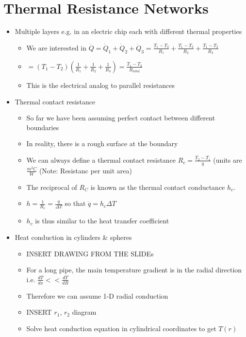 \documentclass[12pt]{article}
\begin{document}
\section{Thermal Resistance Networks}
\begin{itemize}
    \item Multiple layers e.g. in an electric chip each with different thermal properties \begin{itemize}
        \item We are interested in $\dot{Q} = \dot{Q}_1 + \dot{Q}_2 + \dot{Q}_3 = \frac{T_1-T_2}{R_1} + \frac{T_1-T_2}{R_2} +  \frac{T_1-T_2}{R_3}$
        \item $ = (T_1-T_2)(\frac{1}{R_1} + \frac{1}{R_2} + \frac{1}{R_3}) = \frac{T_1-T_2}{R_{total}}$
        \item This is the electrical analog to parallel resistances
    \end{itemize}
    \item Thermal contact resistance \begin{itemize}
        \item So far we have been assuming perfect contact between different boundaries
        \item In reality, there is a rough surface at the boundary
        \item We can always define a thermal contact resistance $R_c = \frac{T_2-T_1}{\dot{q}}$ (units are $\frac{m^2 C}{W}$ (Note: Resistanc per unit area)
        \item The reciprocal of $R_C$ is known as the thermal contact conductance $h_c$. 
        \item $h = \frac{1}{R_c} = \frac{\dot{q}}{\Delta T}$ so that $\dot{q} = h_c \Delta T$
        \item $h_c$ is thus similar to the heat transfer coefficient
    \end{itemize}
    \item Heat conduction in cylinders \& spheres \begin{itemize}
        \item INSERT DRAWING FROM THE SLIDEs
        \item For a long pipe, the main temperature gradient is in the radial direction i.e. $\frac{dT}{dx} << \frac{dT}{dR}$
        \item Therefore we can assume 1-D radial conduction
        \item INSERT $r_1$, $r_2$ diagram 
        \item Solve heat conduction equation in cylindrical coordinates to get $T(r)$

\end{itemize}
\end{itemize}
\end{document}
